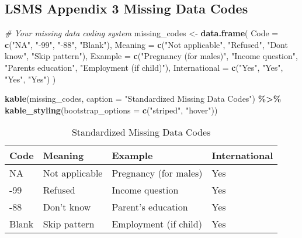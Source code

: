 \documentclass[
]{article}
\newenvironment{Shaded}{\begin{snugshade}}{\end{snugshade}}
\newcommand{\AttributeTok}[1]{\textcolor[rgb]{0.13,0.29,0.53}{#1}}
\newcommand{\CommentTok}[1]{\textcolor[rgb]{0.56,0.35,0.01}{\textit{#1}}}
\newcommand{\FunctionTok}[1]{\textcolor[rgb]{0.13,0.29,0.53}{\textbf{#1}}}
\newcommand{\NormalTok}[1]{#1}
\newcommand{\OtherTok}[1]{\textcolor[rgb]{0.56,0.35,0.01}{#1}}
\newcommand{\SpecialCharTok}[1]{\textcolor[rgb]{0.81,0.36,0.00}{\textbf{#1}}}
\newcommand{\StringTok}[1]{\textcolor[rgb]{0.31,0.60,0.02}{#1}}
\begin{document}
\subsection{LSMS Appendix 3 Missing Data
Codes}\label{lsms-appendix-3-missing-data-codes}

\begin{Shaded}
\begin{Highlighting}[]
\CommentTok{\# Your missing data coding system}
\NormalTok{missing\_codes }\OtherTok{\textless{}{-}} \FunctionTok{data.frame}\NormalTok{(}
  \AttributeTok{Code =} \FunctionTok{c}\NormalTok{(}\StringTok{"NA"}\NormalTok{, }\StringTok{"{-}99"}\NormalTok{, }\StringTok{"{-}88"}\NormalTok{, }\StringTok{"Blank"}\NormalTok{),}
  \AttributeTok{Meaning =} \FunctionTok{c}\NormalTok{(}\StringTok{"Not applicable"}\NormalTok{, }\StringTok{"Refused"}\NormalTok{, }
              \StringTok{"Don\textquotesingle{}t know"}\NormalTok{, }\StringTok{"Skip pattern"}\NormalTok{),}
  \AttributeTok{Example =} \FunctionTok{c}\NormalTok{(}\StringTok{"Pregnancy (for males)"}\NormalTok{, }\StringTok{"Income question"}\NormalTok{,}
              \StringTok{"Parent\textquotesingle{}s education"}\NormalTok{, }\StringTok{"Employment (if child)"}\NormalTok{),}
  \AttributeTok{International =} \FunctionTok{c}\NormalTok{(}\StringTok{"Yes"}\NormalTok{, }\StringTok{"Yes"}\NormalTok{, }\StringTok{"Yes"}\NormalTok{, }\StringTok{"Yes"}\NormalTok{)}
\NormalTok{)}

\FunctionTok{kable}\NormalTok{(missing\_codes, }\AttributeTok{caption =} \StringTok{"Standardized Missing Data Codes"}\NormalTok{) }\SpecialCharTok{\%\textgreater{}\%}
  \FunctionTok{kable\_styling}\NormalTok{(}\AttributeTok{bootstrap\_options =} \FunctionTok{c}\NormalTok{(}\StringTok{"striped"}\NormalTok{, }\StringTok{"hover"}\NormalTok{))}
\end{Highlighting}
\end{Shaded}

\begin{longtable}[t]{llll}
\caption{\label{tab:missing-codes}Standardized Missing Data Codes}\\
\toprule
Code & Meaning & Example & International\\
\midrule
NA & Not applicable & Pregnancy (for males) & Yes\\
-99 & Refused & Income question & Yes\\
-88 & Don't know & Parent's education & Yes\\
Blank & Skip pattern & Employment (if child) & Yes\\
\bottomrule
\end{longtable}
\end{document}
